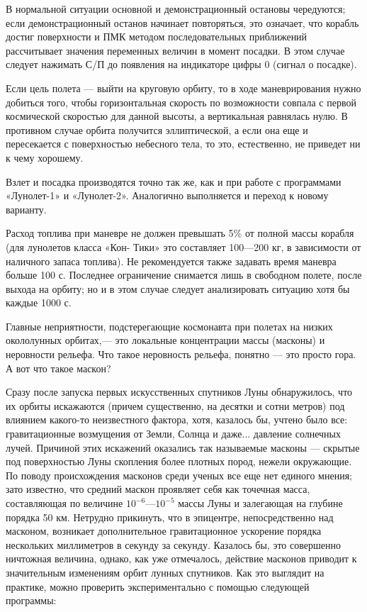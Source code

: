 \documentclass[11pt,a4paper,oneside]{article}
\begin{document}
В нормальной ситуации основной и демонстрационный остановы чередуются; если демонстрационный останов начинает повторяться, это означает, что корабль достиг поверхности и ПМК методом последовательных приближений рассчитывает значения переменных величин в момент посадки. В этом случае следует нажимать С/П до появления на индикаторе цифры 0 (сигнал о посадке).

Если цель полета — выйти на круговую орбиту, то в ходе маневрирования нужно добиться того, чтобы горизонтальная скорость по возможности совпала с первой космической скоростью для данной высоты, а вертикальная равнялась нулю. В противном случае орбита получится эллиптической, а если она еще и пересекается с поверхностью небесного тела, то это, естественно, не приведет ни к чему хорошему.

Взлет и посадка производятся точно так же, как и при работе с программами «Лунолет-1» и «Лунолет-2». Аналогично выполняется и переход к новому варианту.

Расход топлива при маневре не должен превышать 5\% от полной массы корабля (для лунолетов класса «Кон- Тики» это составляет 100—200 кг, в зависимости от наличного запаса топлива). Не рекомендуется также задавать время маневра больше 100 с. Последнее ограничение снимается лишь в свободном полете, после выхода на орбиту; но и в этом случае следует анализировать ситуацию хотя бы каждые 1000 с.

Главные неприятности, подстерегающие космонавта при полетах на низких окололунных орбитах,— это локальные концентрации массы (масконы) и неровности рельефа. Что такое неровность рельефа, понятно — это просто гора. А вот что такое маскон?

Сразу после запуска первых искусственных спутников Луны обнаружилось, что их орбиты искажаются (причем существенно, на десятки и сотни метров) под влиянием какого-то неизвестного фактора, хотя, казалось бы, учтено было все: гравитационные возмущения от Земли, Солнца и даже... давление солнечных лучей. Причиной этих искажений оказались так называемые масконы — скрытые под поверхностью Луны скопления более плотных пород, нежели окружающие. По поводу происхождения масконов среди ученых все еще нет единого мнения; зато известно, что средний маскон проявляет себя как точечная масса, составляющая по величине $10^{-6}—10^{-5}$ массы Луны и залегающая на глубине порядка 50 км. Нетрудно прикинуть, что в эпицентре, непосредственно над масконом, возникает дополнительное гравитационное ускорение порядка нескольких миллиметров в секунду за секунду. Казалось бы, это совершенно ничтожная величина, однако, как уже отмечалось, действие масконов приводит к значительным изменениям орбит лунных спутников. Как это выглядит на практике, можно проверить экспериментально с помощью следующей программы:
\end{document}
